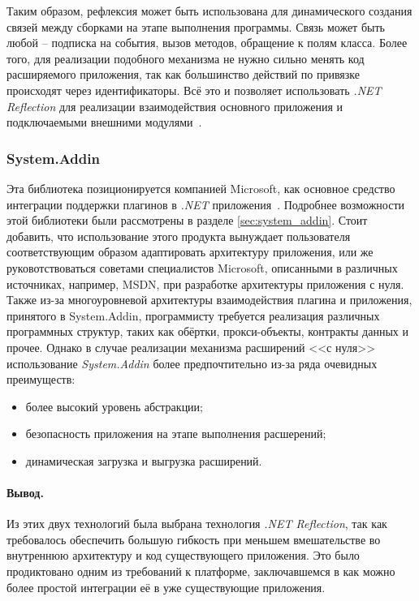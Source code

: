 Таким образом, рефлексия может быть использована для динамического создания связей между сборками на этапе выполнения программы. Связь может быть любой – подписка на события, вызов методов, обращение к полям класса. Более того, для реализации подобного механизма не нужно сильно менять код расширяемого приложения, так как большинство действий по привязке происходят через идентификаторы. Всё это и позволяет использовать {\it .NET Reflection} для реализации взаимодействия основного приложения и подключаемыми внешними модулями~\cite{addins2-article}.

\subsubsection{System.Addin}

Эта библиотека позиционируется компанией Microsoft, как основное средство интеграции поддержки плагинов в {\it .NET} приложения~\cite{addins1-article}. Подробнее возможности этой библиотеки были рассмотрены в разделе \ref{sec:system_addin}. Стоит добавить, что использование этого продукта вынуждает пользователя соответствующим образом адаптировать архитектуру приложения, или же руковотствоваться советами специалистов Microsoft, описанными в различных источниках, например, MSDN, при разработке архитектуры приложения с нуля. Также из-за многоуровневой архитектуры взаимодействия плагина и приложения, принятого в System.Addin, программисту требуется реализация различных программных структур, таких как обёртки, прокси-объекты, контракты данных и прочее. Однако в случае реализации механизма расширений <<с нуля>> использование {\it System.Addin} более предпочтительно из-за ряда очевидных преимуществ:

\begin{itemize}
  \item более высокий уровень абстракции;
  \item безопасность приложения на этапе выполнения расшерений;
  \item динамическая загрузка и выгрузка расширений.
\end{itemize}

\paragraph{Вывод.}

Из этих двух технологий была выбрана технология {\it .NET Reflection}, так как требовалось обеспечить большую гибкость при меньшем вмешательстве во внутреннюю архитектуру и код существующего приложения. Это было продиктовано одним из требований к платформе, заключавшемся в как можно более простой интеграции её в уже существующие приложения.

